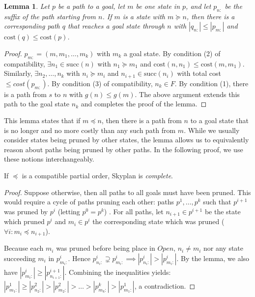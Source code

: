 \documentclass[letterpaper]{article}
\theoremstyle{plain} \newtheorem{theorem}{Theorem} \newtheorem{proposition}{Proposition} \newtheorem{lemma}{Lemma}
\theoremstyle{definition} \newtheorem{definition}{Definition} \newtheorem{conjecture}{Conjecture} \newtheorem*{example}{Example}
\theoremstyle{remark} \newtheorem*{remark}{Remark} \newtheorem*{note}{Note} \newtheorem{case}{Case}
\begin{document}
\begin{lemma}{}\label{clm-complete-lemma}
  Let $p$ be a path to a goal, let $m$ be one state in $p$, and let 
$p_{n:}$ be the suffix of the path starting from $n$. If $m$ is a state
with $m \succeq n$, then there is a corresponding path $q$ that reaches a goal state
through $n$ with $|q_{n:}| \leq |p_{m:}|$ and $\mathrm{cost}(q) \leq \mathrm{cost}(p)$.
\end{lemma}
\begin{proof}
$p_{m:}=(m,m_{1},\dots,m_{k})$ with $m_{k}$ a goal state.
By condition (2) of compatibility, $\exists n_{1} \in \mathrm{succ}(n)$ 
with $n_{1} \succeq m_{1}$ and $\mathrm{cost}(n,n_{1}) \leq \mathrm{cost}(m,m_{1})$. 
Similarly, $\exists n_{2},\dots,n_{k}$ with 
$n_{i} \succeq m_{i}$ and $n_{i+1} \in \mathrm{succ}(n_{i})$ with 
total cost $\leq cost(p_{m:})$.
By condition (3) of compatibility, $n_{k} \in F$. By condition (1),
there is a path from $s$ to $n$ with $g(n) \leq g(m)$. The above argument extends this path
to the goal state $n_{k}$ and completes the proof of the lemma.
\end{proof}

This lemma states that if $m \preceq n$, then there is a path from $n$ to a goal
state that is no longer and no more costly than any such path from $m$.
While we usually consider states being pruned by other states, the lemma
allows us to equivalently reason about paths being pruned by other paths.
In the following proof, we use these notions interchangeably.


\begin{claim}{}\label{clm-complete}
   If $\preceq$ is a compatible partial order, Skyplan
is \emph{complete}.
\end{claim}
\begin{proof}
Suppose otherwise, then all paths to all goals must
have been pruned. This would require a cycle of paths pruning each other: 
paths $p^{1},\dots,p^{k}$ such that $p^{i+1}$ was pruned by $p^{i}$ (letting $p^{0}=p^{k}$) .
For all paths, let $n_{i+1} \in p^{i+1}$ be the state which pruned $p^{i}$ and
$m_{i} \in p^{i}$ the corresponding state which was pruned 
($\forall i: m_{i} \preceq n_{i+1}$).

Because each $m_{i}$ was pruned before being place in $Open$,
$n_{i} \neq m_{i}$ nor any state succeeding $m_{i}$ in $p^{i}_{m_{i}:}$.
Hence $p^{i}_{n_{i}:} \supsetneq p^{i}_{m_{i}:} \implies |p^{i}_{n_{i}:}| > |p^{i}_{m_{i}:}|$.
By the lemma, we also have %
 $|p^{i}_{m_{i}:}| \geq |p^{i+1}_{n_{i+1}:}|$. Combining the
inequalities yields: $|p^{1}_{m_{1}:}| \geq |p^{2}_{n_{2}:}| > |p^{2}_{m_{2}:}| > \dots > |p^{k}_{m_{k}:}| > |p^{1}_{m_{1}:}|$, 
a contradiction.
\end{proof}
  
\end{document}
